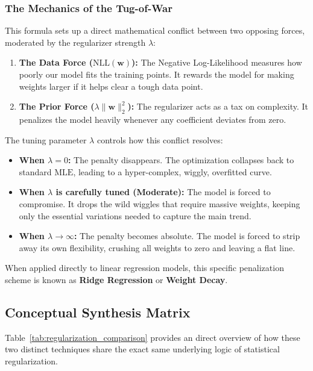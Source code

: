 \documentclass{article}
\begin{document}
\subsubsection{The Mechanics of the Tug-of-War}
This formula sets up a direct mathematical conflict between two opposing forces, moderated by the regularizer strength $\lambda$:
\begin{enumerate}
    \item \textbf{The Data Force ($\text{NLL}(\mathbf{w})$):} The Negative Log-Likelihood measures how poorly our model fits the training points. It rewards the model for making weights larger if it helps clear a tough data point.
    \item \textbf{The Prior Force ($\lambda \|\mathbf{w}\|_2^2$):} The regularizer acts as a tax on complexity. It penalizes the model heavily whenever any coefficient deviates from zero.
\end{enumerate}

The tuning parameter $\lambda$ controls how this conflict resolves:
\begin{itemize}
    \item \textbf{When $\lambda = 0$:} The penalty disappears. The optimization collapses back to standard $\text{MLE}$, leading to a hyper-complex, wiggly, overfitted curve.
    \item \textbf{When $\lambda$ is carefully tuned (Moderate):} The model is forced to compromise. It drops the wild wiggles that require massive weights, keeping only the essential variations needed to capture the main trend.
    \item \textbf{When $\lambda \to \infty$:} The penalty becomes absolute. The model is forced to strip away its own flexibility, crushing all weights to zero and leaving a flat line.
\end{itemize}

When applied directly to linear regression models, this specific penalization scheme is known as \textbf{Ridge Regression} or \textbf{Weight Decay}.



\subsection{Conceptual Synthesis Matrix}
Table~\ref{tab:regularization_comparison} provides an direct overview of how these two distinct techniques share the exact same underlying logic of statistical regularization.
\end{document}
